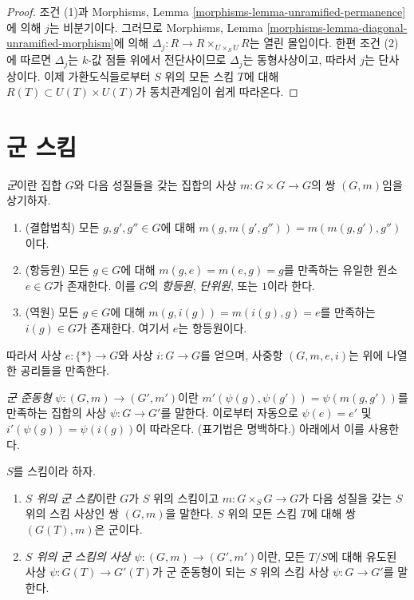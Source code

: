 \begin{proof}
조건 (1)과 Morphisms, Lemma
\ref{morphisms-lemma-unramified-permanence}에 의해 $j$는 비분기이다. 그러므로
Morphisms, Lemma \ref{morphisms-lemma-diagonal-unramified-morphism}에 의해
$\Delta_j : R \to R \times_{U \times_S U} R$는 열린 몰입이다.
한편 조건 (2)에 따르면 $\Delta_j$는 $k$-값 점들 위에서 전단사이므로
$\Delta_j$는 동형사상이고, 따라서 $j$는 단사상이다. 이제 가환도식들로부터
$S$ 위의 모든 스킴 $T$에 대해 $R(T) \subset U(T) \times U(T)$가 동치관계임이
쉽게 따라온다.
\end{proof}













\section{군 스킴}
\label{section-group-schemes}

\noindent
{\it 군}이란 집합 $G$와 다음 성질들을 갖는 집합의 사상
$m : G \times G \to G$의 쌍 $(G, m)$임을 상기하자.
\begin{enumerate}
\item (결합법칙) 모든 $g, g', g'' \in G$에 대해
$m(g, m(g', g'')) = m(m(g, g'), g'')$이다.
\item (항등원) 모든 $g \in G$에 대해 $m(g, e) = m(e, g) = g$를
만족하는 유일한 원소 $e \in G$가 존재한다. 이를 $G$의
{\it 항등원}, {\it 단위원}, 또는 $1$이라 한다.
\item (역원) 모든 $g \in G$에 대해
$m(g, i(g)) = m(i(g), g) = e$를 만족하는 $i(g) \in G$가 존재한다. 여기서
$e$는 항등원이다.
\end{enumerate}
따라서 사상 $e : \{*\} \to G$와 사상 $i : G \to G$를 얻으며,
사중항 $(G, m, e, i)$는 위에 나열한 공리들을 만족한다.

\medskip\noindent
{\it 군 준동형} $\psi : (G, m) \to (G', m')$이란
$m'(\psi(g), \psi(g')) = \psi(m(g, g'))$를 만족하는 집합의 사상
$\psi : G \to G'$를 말한다. 이로부터 자동으로 $\psi(e) = e'$ 및
$i'(\psi(g)) = \psi(i(g))$이 따라온다. (표기법은 명백하다.) 아래에서 이를 사용한다.

\begin{definition}
\label{definition-group-scheme}
$S$를 스킴이라 하자.
\begin{enumerate}
\item {\it $S$ 위의 군 스킴}이란 $G$가 $S$ 위의 스킴이고
$m : G \times_S G \to G$가 다음 성질을 갖는 $S$ 위의 스킴 사상인 쌍
$(G, m)$을 말한다. $S$ 위의 모든 스킴 $T$에 대해 쌍
$(G(T), m)$은 군이다.
\item {\it $S$ 위의 군 스킴의 사상
$\psi : (G, m) \to (G', m')$}이란, 모든 $T/S$에 대해 유도된 사상
$\psi : G(T) \to G'(T)$가 군 준동형이 되는 $S$ 위의 스킴 사상
$\psi : G \to G'$를 말한다.
\end{enumerate}
\end{definition}


